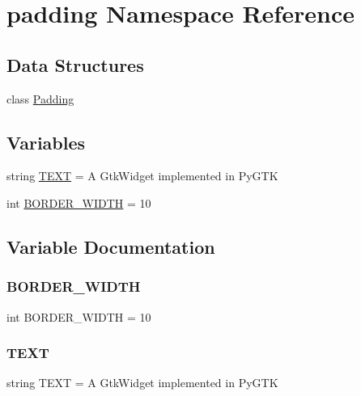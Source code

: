 \hypertarget{namespacepadding}{}\section{padding Namespace Reference}
\label{namespacepadding}
\subsection*{Data Structures}
\begin{DoxyCompactItemize}
\item 
class \hyperlink{classpadding_1_1_padding}{Padding}
\end{DoxyCompactItemize}
\subsection*{Variables}
\begin{DoxyCompactItemize}
\item 
string \hyperlink{namespacepadding_afebd8677b710a574d2c5fb49034e44ac}{T\+E\+XT} = \textquotesingle{}A Gtk\+Widget implemented in Py\+G\+TK\textquotesingle{}
\item 
int \hyperlink{namespacepadding_a2da115e5db18f2106ef2091fd67195cf}{B\+O\+R\+D\+E\+R\+\_\+\+W\+I\+D\+TH} = 10
\end{DoxyCompactItemize}


\subsection{Variable Documentation}
\mbox{\label{namespacepadding_a2da115e5db18f2106ef2091fd67195cf}} 
\subsubsection{\texorpdfstring{B\+O\+R\+D\+E\+R\+\_\+\+W\+I\+D\+TH}{BORDER\_WIDTH}}
{\footnotesize\ttfamily int B\+O\+R\+D\+E\+R\+\_\+\+W\+I\+D\+TH = 10}

\mbox{\label{namespacepadding_afebd8677b710a574d2c5fb49034e44ac}} 
\subsubsection{\texorpdfstring{T\+E\+XT}{TEXT}}
{\footnotesize\ttfamily string T\+E\+XT = \textquotesingle{}A Gtk\+Widget implemented in Py\+G\+TK\textquotesingle{}}

